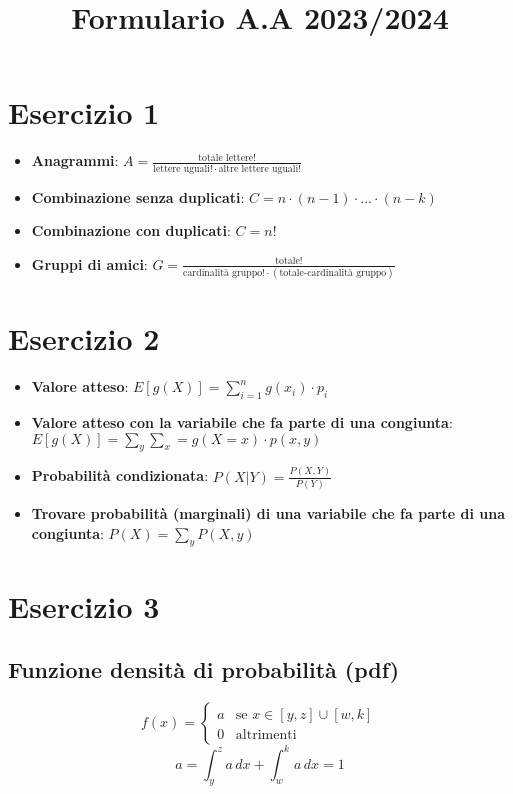 \documentclass[12pt]{article}
\title{Formulario A.A 2023/2024}
\author{}
\begin{document}
\maketitle
\section{Esercizio 1}
\begin{itemize}
    \item \textbf{Anagrammi}: $A = \frac{\text{totale lettere}!}{\text{lettere uguali}!\cdot\text{altre lettere uguali}!}$
    \item \textbf{Combinazione senza duplicati}: $C = n\cdot (n-1)\cdot\ldots\cdot(n-k)$
    \item \textbf{Combinazione con duplicati}: $C = n!$
    \item \textbf{Gruppi di amici}: $G = \frac{\text{totale}!}{\text{cardinalità gruppo}!\cdot(\text{totale-cardinalità gruppo})}$
\end{itemize}
\section{Esercizio 2}
\begin{itemize}
    \item \textbf{Valore atteso}: $E[g(X)] = \sum_{i=1}^{n}g(x_i)\cdot p_i$
    \item \textbf{Valore atteso con la variabile che fa parte di una congiunta}: $E[g(X)] = \sum_{y}\sum_{x}=g(X=x)\cdot p(x,y)$
    \item \textbf{Probabilità condizionata}: $P(X|Y) = \frac{P(X,Y)}{P(Y)}$
    \item \textbf{Trovare probabilità (marginali) di una variabile che fa parte di una congiunta}: $P(X) = \sum_{y}P(X,y)$
\end{itemize}
\section{Esercizio 3}
\subsection{Funzione densità di probabilità (pdf)}
\begin{equation*}
    f(x) = \begin{cases}
        a & \text{se } x \in [y,z]\cup[w,k]\\
        0 & \text{altrimenti}
    \end{cases}
\end{equation*}
\begin{equation*}
    a = \int_{y}^{z}a \,dx + \int_{w}^{k}a \,dx = 1
\end{equation*}
\end{document}
